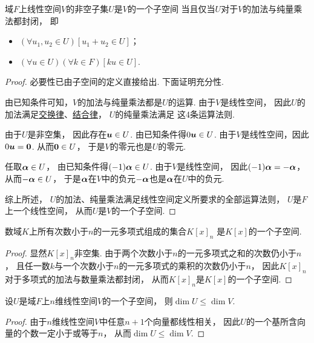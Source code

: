 \begin{theorem}\label{theorem:线性空间.子空间的判定}
域\(F\)上线性空间\(V\)的非空子集\(U\)是\(V\)的一个子空间
当且仅当\(U\)对于\(V\)的加法与纯量乘法都封闭，
即\begin{itemize}
	\item \((\forall u_1,u_2\in U)[u_1+u_2 \in U]\)；
	\item \((\forall u\in U)(\forall k\in F)[ku\in U]\).
\end{itemize}
\begin{proof}
必要性已由子空间的定义直接给出.
下面证明充分性.

由已知条件可知，\(V\)的加法与纯量乘法都是\(U\)的运算.
由于\(V\)是线性空间，
因此\(U\)的加法满足\hyperref[definition:线性空间.运算法则1]{交换律}、\hyperref[definition:线性空间.运算法则2]{结合律}，
\(U\)的纯量乘法满足  这4条运算法则.

由于\(U\)是非空集，
因此存在\(\boldsymbol{u} \in U\).
由已知条件得\(0 \boldsymbol{u} \in U\).
由于\(V\)是线性空间，因此\(0 \boldsymbol{u} = \boldsymbol0\).
从而\(\boldsymbol0 \in U\)，
于是\(V\)的零元也是\(U\)的零元.

任取\(\boldsymbol\alpha \in U\)，
由已知条件得\((-1) \boldsymbol\alpha \in U\).
由于\(V\)是线性空间，
因此\((-1) \boldsymbol\alpha = -\boldsymbol\alpha\)，
从而\(-\boldsymbol\alpha \in U\)，
于是\(\boldsymbol\alpha\)在\(V\)中的负元\(-\boldsymbol\alpha\)也是\(\boldsymbol\alpha\)在\(U\)中的负元.

综上所述，
\(U\)的加法、纯量乘法满足线性空间定义所要求的全部运算法则，
\(U\)是\(F\)上一个线性空间，
从而\(U\)是\(V\)的一个子空间.
\end{proof}
\end{theorem}

\begin{example}
数域\(K\)上所有次数小于\(n\)的一元多项式组成的集合\(K[x]_n\)
是\(K[x]\)的一个子空间.
\begin{proof}
显然\(K[x]_n\)非空集.
由于两个次数小于\(n\)的一元多项式之和的次数仍小于\(n\)，
且任一数\(k\)与一个次数小于\(n\)的一元多项式的乘积的次数仍小于\(n\)，
因此\(K[x]_n\)对于多项式的加法与数量乘法都封闭，
从而\(K[x]_n\)是\(K[x]\)的一个子空间.
\end{proof}
\end{example}

\begin{proposition}
设\(U\)是域\(F\)上\(n\)维线性空间\(V\)的一个子空间，
则\(\dim U\leq\dim V\).
\begin{proof}
由于\(n\)维线性空间\(V\)中任意\(n+1\)个向量都线性相关，
因此\(U\)的一个基所含向量的个数一定小于或等于\(n\)，
从而\(\dim U\leq\dim V\).
\end{proof}
\end{proposition}

